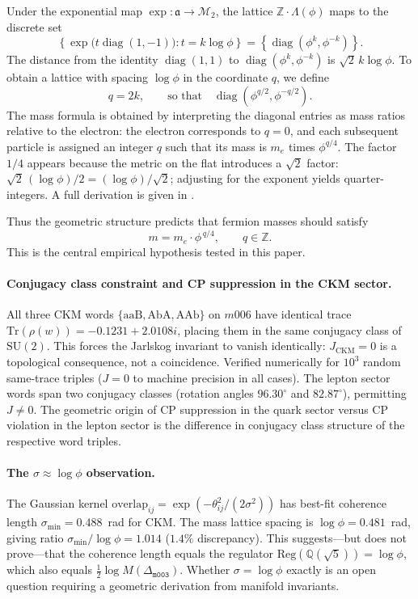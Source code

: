 ﻿\documentclass[12pt]{article}
\theoremstyle{definition}
\begin{document}
Under the exponential map $\exp:\mathfrak{a}\to\mathcal{M}_2$, the lattice $\mathbb{Z}\cdot\Lambda(\phi)$ maps to the discrete set
\[
\left\{ \exp\!\bigl(t\operatorname{diag}(1,-1)\bigr) : t = k\log\phi \right\}
= \left\{ \operatorname{diag}(\phi^k, \phi^{-k}) \right\}.
\]
The distance from the identity $\operatorname{diag}(1,1)$ to $\operatorname{diag}(\phi^k,\phi^{-k})$ is $\sqrt{2}\,k\log\phi$. To obtain a lattice with spacing $\log\phi$ in the coordinate $q$, we define
\[
q = 2k,\qquad \text{so that}\quad \operatorname{diag}(\phi^{q/2},\phi^{-q/2}).
\]
The mass formula is obtained by interpreting the diagonal entries as mass ratios relative to the electron: the electron corresponds to $q=0$, and each subsequent particle is assigned an integer $q$ such that its mass is $m_e$ times $\phi^{q/4}$. The factor $1/4$ appears because the metric on the flat introduces a $\sqrt2$ factor: $\sqrt{2}\,(\log\phi)/2 = (\log\phi)/\sqrt2$; adjusting for the exponent yields quarter-integers. A full derivation is given in \cite{Gentry:ShapeSpace}.

Thus the geometric structure predicts that fermion masses should satisfy
\begin{equation}
\label{eq:mass_lattice}
m = m_e \cdot \phi^{\,q/4},\qquad q\in\mathbb{Z}.
\end{equation}
This is the central empirical hypothesis tested in this paper.




\paragraph{Conjugacy class constraint and CP suppression in the CKM sector.}
All three CKM words $\{\mathrm{aaB},\mathrm{AbA},\mathrm{AAb}\}$ on $m006$
have identical trace $\mathrm{Tr}(\rho(w))=-0.1231+2.0108i$,
placing them in the same conjugacy class of $\mathrm{SU}(2)$.
This forces the Jarlskog invariant to vanish identically: $J_{\mathrm{CKM}}=0$
is a topological consequence, not a coincidence.
Verified numerically for $10^3$ random same-trace triples ($J=0$ to
machine precision in all cases).
The lepton sector words span two conjugacy classes
(rotation angles $96.30^\circ$ and $82.87^\circ$), permitting $J\neq0$.
The geometric origin of CP suppression in the quark sector versus
CP violation in the lepton sector is the difference in conjugacy class
structure of the respective word triples.

\paragraph{The $\sigma\approx\log\phi$ observation.}
The Gaussian kernel
$\mathrm{overlap}_{ij}=\exp(-\theta_{ij}^2/(2\sigma^2))$
has best-fit coherence length $\sigma_{\min}=0.488$~rad for CKM.
The mass lattice spacing is $\log\phi=0.481$~rad, giving ratio
$\sigma_{\min}/\log\phi=1.014$ ($1.4\%$ discrepancy).
This suggests---but does not prove---that the coherence length
equals the regulator $\mathrm{Reg}(\mathbb{Q}(\sqrt5))=\log\phi$,
which also equals $\tfrac{1}{2}\log M(\Delta_{\texttt{m003}})$.
Whether $\sigma=\log\phi$ exactly is an open question requiring
a geometric derivation from manifold invariants.
\end{document}
